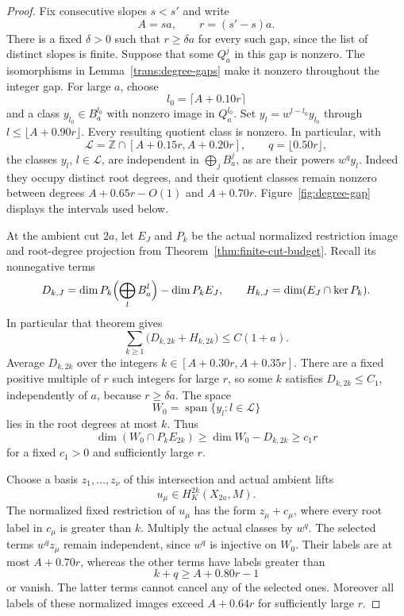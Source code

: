 \begin{proof}
Fix consecutive slopes $s<s'$ and write
\[
 A=sa,\qquad r=(s'-s)a.
\]
There is a fixed $\delta>0$ such that $r\ge\delta a$ for every such
gap, since the list of distinct slopes is finite.  Suppose that some
$Q_a^j$ in this gap is nonzero.  The isomorphisms in
Lemma~\ref{trans:degree-gaps} make it nonzero throughout the integer
gap.  For large $a$, choose
\[
 l_0=\lceil A+0.10r\rceil
\]
and a class $y_{l_0}\in B_a^{l_0}$ with nonzero image in $Q_a^{l_0}$.
Set $y_l=w^{l-l_0}y_{l_0}$ through
$l\le\lfloor A+0.90r\rfloor$.  Every resulting quotient class is
nonzero.  In particular, with
\[
 \mathcal L=\mathbb Z\cap[A+0.15r,A+0.20r],
 \qquad q=\lfloor0.50r\rfloor,
\]
the classes $y_l$, $l\in\mathcal L$, are independent in
$\bigoplus_j B_a^j$, as are their powers $w^q y_l$.
Indeed they occupy distinct root degrees, and their quotient classes
remain nonzero between degrees $A+0.65r-O(1)$ and $A+0.70r$.
Figure~\ref{fig:degree-gap} displays the intervals used below.

At the ambient cut $2a$, let $E_J$ and $P_k$ be the actual normalized
restriction image and root-degree projection from
Theorem~\ref{thm:finite-cut-budget}.  Recall its nonnegative terms
\[
 D_{k,J}=\dim P_k\Bigl(\bigoplus_l B_a^l\Bigr)-\dim P_kE_J,
 \qquad H_{k,J}=\dim(E_J\cap\ker P_k).
\]
In particular that theorem gives
\begin{equation}\label{trans:used-budget}
 \sum_{k\ge1}\bigl(D_{k,2k}+H_{k,2k}\bigr)\le C(1+a).
\end{equation}
Average $D_{k,2k}$ over the integers
$k\in[A+0.30r,A+0.35r]$.  There are a fixed positive multiple of $r$
such integers for large $r$, so some $k$ satisfies
$D_{k,2k}\le C_1$, independently of $a$, because $r\ge\delta a$.
The space
\[
 W_0=\operatorname{span}\{y_l:l\in\mathcal L\}
\]
lies in the root degrees at most $k$.  Thus
\[
 \dim(W_0\cap P_kE_{2k})
 \ge\dim W_0-D_{k,2k}\ge c_1r
\]
for a fixed $c_1>0$ and sufficiently large $r$.

Choose a basis $z_1,\ldots,z_\nu$ of this intersection and actual
ambient lifts
\[
 u_\mu\in H_K^{2k}(X_{2a},M).
\]
The normalized fixed restriction of $u_\mu$ has the form
$z_\mu+c_\mu$, where every root label in $c_\mu$ is greater than $k$.
Multiply the actual classes by $w^q$.  The selected terms
$w^q z_\mu$ remain independent, since $w^q$ is injective on $W_0$.
Their labels are at most $A+0.70r$, whereas the other terms have
labels greater than
\[
 k+q\ge A+0.80r-1
\]
or vanish.  The latter terms cannot cancel any of the selected ones.
Moreover all labels of these normalized images exceed $A+0.64r$
for sufficiently large $r$.


\end{proof}

